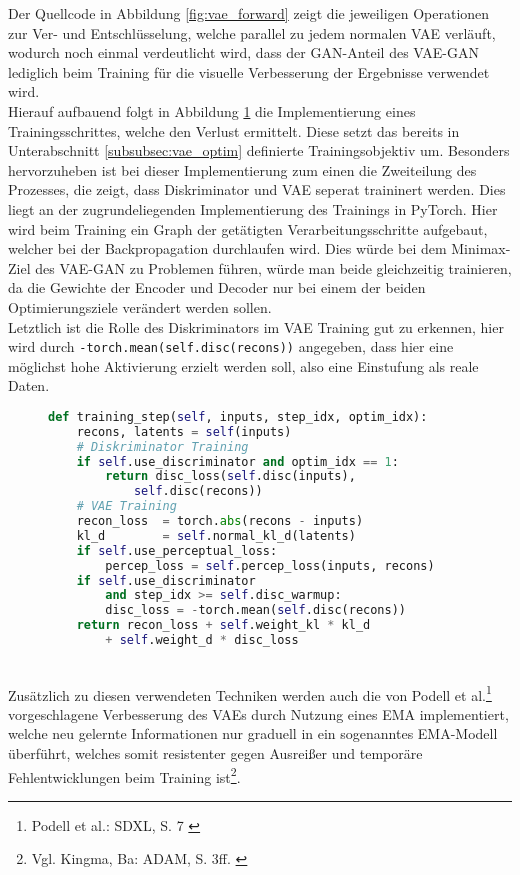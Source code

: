 Der Quellcode in Abbildung \ref{fig:vae_forward} zeigt die jeweiligen Operationen zur Ver- und Entschlüsselung, welche parallel zu jedem normalen \ac{VAE} verläuft, wodurch noch einmal verdeutlicht wird, dass der \ac{GAN}-Anteil des VAE-GAN lediglich beim Training für die visuelle Verbesserung der Ergebnisse verwendet wird. \\
Hierauf aufbauend folgt in Abbildung \ref{fig:vae_training} die Implementierung eines Trainingsschrittes, welche den Verlust ermittelt. Diese setzt das bereits in Unterabschnitt \ref{subsubsec:vae_optim} definierte Trainingsobjektiv um. Besonders hervorzuheben ist bei dieser Implementierung zum einen die Zweiteilung des Prozesses, die zeigt, dass Diskriminator und \ac{VAE} seperat traininert werden. Dies liegt an der zugrundeliegenden Implementierung des Trainings in PyTorch. Hier wird beim Training ein Graph der getätigten Verarbeitungsschritte aufgebaut, welcher bei der Backpropagation durchlaufen wird. Dies würde bei dem Minimax-Ziel des VAE-GAN zu Problemen führen, würde man beide gleichzeitig trainieren, da die Gewichte der Encoder und Decoder nur bei einem der beiden Optimierungsziele verändert werden sollen. \\
Letztlich ist die Rolle des Diskriminators im \ac{VAE} Training gut zu erkennen, hier wird durch \texttt{-torch.mean(self.disc(recons))} angegeben, dass hier eine möglichst hohe Aktivierung erzielt werden soll, also eine Einstufung als reale Daten. 
\begin{figure}[htbp]
\begin{lstlisting}[language=python]
def training_step(self, inputs, step_idx, optim_idx):
    recons, latents = self(inputs)
    # Diskriminator Training 
    if self.use_discriminator and optim_idx == 1:
        return disc_loss(self.disc(inputs), 
            self.disc(recons))
    # VAE Training
    recon_loss  = torch.abs(recons - inputs)
    kl_d        = self.normal_kl_d(latents)      
    if self.use_perceptual_loss:   
        percep_loss = self.percep_loss(inputs, recons)
    if self.use_discriminator 
        and step_idx >= self.disc_warmup:    
        disc_loss = -torch.mean(self.disc(recons))
    return recon_loss + self.weight_kl * kl_d 
        + self.weight_d * disc_loss 
\end{lstlisting}
    \captionsetup{type=figure}
    \label{fig:vae_training}
\end{figure} \\
Zusätzlich zu diesen verwendeten Techniken werden auch die von Podell et al.\footnote{
    Podell et al.: SDXL, S. 7 
    \cite{podell2023sdxlimprovinglatentdiffusion}
} vorgeschlagene Verbesserung des \ac{VAE}s durch Nutzung eines \ac{EMA} implementiert, welche neu gelernte Informationen nur graduell in ein sogenanntes \ac{EMA}-Modell überführt, welches somit resistenter gegen Ausreißer und temporäre Fehlentwicklungen beim Training ist\footnote{
    Vgl. Kingma, Ba: ADAM, S. 3ff. 
    \cite{kingma2017adammethodstochasticoptimization}
}. 



